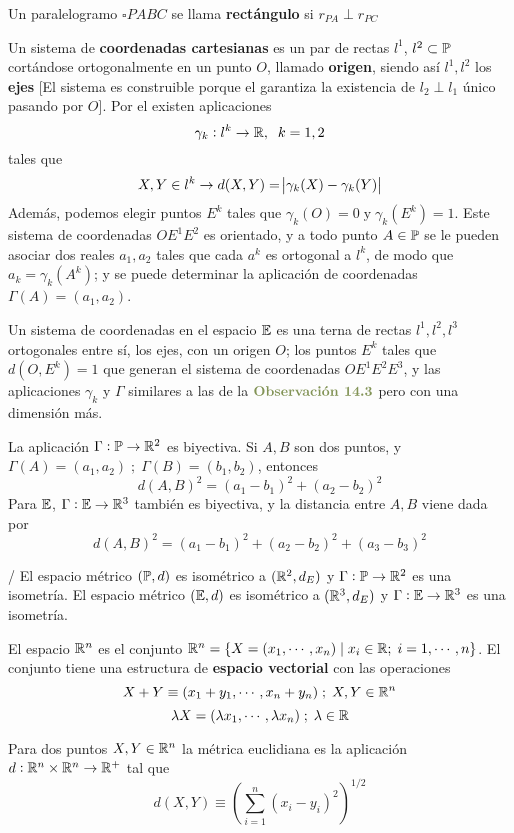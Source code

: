  Un paralelogramo $\square PABC$ se llama \textbf{rectángulo} si $r_{PA} \perp r_{PC}$


 Un sistema de \textbf{coordenadas cartesianas} es un par de rectas $l^1$, $l^2 \subset \P$ cortándose ortogonalmente en un punto $O$, llamado \textbf{origen}, siendo así $l^1,l^2$ los \textbf{ejes} [El sistema es construible porque el  garantiza la existencia de $l_2 \perp l_1$ único pasando por $O$].
Por el  existen aplicaciones
$$\gamma_k: l^k \rightarrow \R, \;\; k = 1,2$$
tales que 
$$X,Y \in l^k \rightarrow d(X,Y) = \abs{\gamma_k(X) - \gamma_k(Y)}$$
Además, podemos elegir puntos $E^k$ tales que $\gamma_k(O) = 0\;\text{y}\; \gamma_k(E^k)=1$.
Este sistema de coordenadas $OE^1E^2$ es orientado, y a todo punto $A \in \P$ se le pueden asociar dos reales $a_1, a_2$ tales que cada $a^k$ es ortogonal a $l^k$, de modo que $a_k = \gamma_k(A^k)$; y se puede determinar la aplicación de coordenadas $\Gamma(A) = (a_1,a_2)$.



\obs{[Coordenadas en $\E$]} Un sistema de coordenadas en el espacio $\E$ es una terna de rectas $l^1,l^2,l^3$ ortogonales entre sí, los ejes, con un origen $O$; los puntos $E^k$ tales que $d(O, E^k) = 1$ que generan el sistema de coordenadas $OE^1E^2E^3$, y las aplicaciones $\gamma_k$ y $\Gamma$ similares a las de la $\obs{14.3}$ pero con una dimensión más. 

 La aplicación $\Gamma:\P\rightarrow \R^2$ es biyectiva. Si $A,B$ son dos puntos, y $\Gamma(A) = (a_1,a_2)\;;\;\Gamma(B) = (b_1,b_2)$, entonces 
$$d(A,B)^2 = (a_1-b_1)^2+(a_2-b_2)^2$$
Para $\E$, $\Gamma:\E\rightarrow \R^3$ también es biyectiva, y la distancia entre $A, B$ viene dada por 
$$d(A,B)^2 = (a_1-b_1)^2+(a_2-b_2)^2+(a_3-b_3)^2$$

/ El espacio métrico $(\P,d)$ es isométrico a $(\R^2,d_E)$ y $\Gamma:\P\rightarrow\R^2$ es una isometría. El espacio métrico $(\E,d)$ es isométrico a $(\R^3,d_E)$ y $\Gamma:\E\rightarrow\R^3$ es una isometría.

 El espacio $\R^n$ es el conjunto $\R^n = \{X=(x_1, \cdots, x_n) \; | \; x_i \in \R;\; i = 1,\cdots, n \}$. El conjunto tiene una estructura de \textbf{espacio vectorial} con las operaciones
\[X+Y \equiv (x_1+y_1,\cdots, x_n+y_n) \;;\; X,Y \in \R^n \]
\[\lambda X = (\lambda x_1, \cdots, \lambda x_n) \;;\; \lambda \in \R \]

 Para dos puntos $X,Y \in \R^n$ la métrica euclidiana es la aplicación  $d: \R^n \times \R^n \rightarrow \R^+$ tal que
$$d(X,Y) \equiv \left(\sum_{i = 1}^{n}(x_i-y_i)^2\right) ^{1/2}$$

